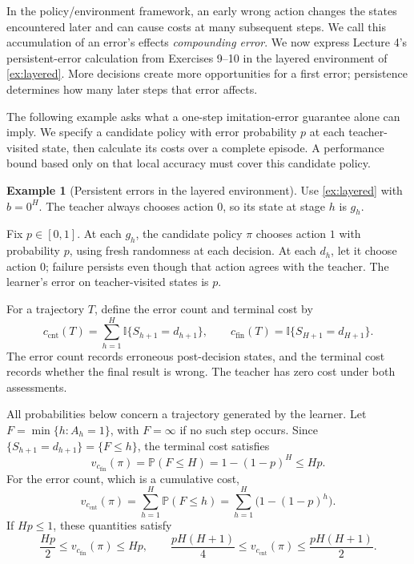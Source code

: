 \documentclass[11pt,twoside]{article}
\newcommand{\I}{\mathbb I}
\renewcommand{\P}{\mathbb P}
\theoremstyle{definition}
\newtheorem{example}[theorem]{Example}
\theoremstyle{remark}
\begin{document}
In the policy/environment framework, an early wrong action changes the
states encountered later and can cause costs at many subsequent steps.
We call this accumulation of an error's effects \emph{compounding error}.
We now express Lecture 4's persistent-error calculation from Exercises 9--10
in the layered environment of \cref{ex:layered}. More decisions create
more opportunities for a first error; persistence determines how many
later steps that error affects.

The following example asks what a one-step imitation-error guarantee alone
can imply. We specify a candidate policy with error probability $p$ at
each teacher-visited state, then calculate its costs over a complete episode.
A performance bound based only on that local accuracy must cover this
candidate policy.

\begin{example}[Persistent errors in the layered environment]
\label{ex:first-error}
Use \cref{ex:layered} with $b=0^H$. The teacher always chooses action $0$,
so its state at stage $h$ is $g_h$.

Fix $p\in[0,1]$. At each $g_h$, the candidate policy $\pi$ chooses action $1$
with probability $p$, using fresh randomness at each decision. At each $d_h$,
let it choose action $0$; failure persists even though that action agrees
with the teacher. The learner's error on teacher-visited states is $p$.

For a trajectory $T$, define the error count and terminal cost by
\[
 c_{\mathrm{cnt}}(T)=\sum_{h=1}^H\I\{S_{h+1}=d_{h+1}\},\qquad
 c_{\mathrm{fin}}(T)=\I\{S_{H+1}=d_{H+1}\}.
\]
The error count records erroneous post-decision states, and the terminal
cost records whether the final result is wrong. The teacher has zero cost
under both assessments.

All probabilities below concern a trajectory generated by the learner. Let
$F=\min\{h:A_h=1\}$, with $F=\infty$ if no such step occurs.
Since $\{S_{h+1}=d_{h+1}\}=\{F\le h\}$, the terminal cost satisfies
\begin{equation}
 v_{c_{\mathrm{fin}}}(\pi)=\P(F\le H)=1-(1-p)^H\le Hp.
 \label{eq:first-error}
\end{equation}
For the error count, which is a cumulative cost,
\begin{equation}
 v_{c_{\mathrm{cnt}}}(\pi)=\sum_{h=1}^H\P(F\le h)
          =\sum_{h=1}^H\bigl(1-(1-p)^h\bigr).
 \label{eq:cumulative-error}
\end{equation}
If $Hp\le1$, these quantities satisfy
\begin{equation}
 \frac{Hp}{2}\le v_{c_{\mathrm{fin}}}(\pi)\le Hp,\qquad
 \frac{pH(H+1)}4\le v_{c_{\mathrm{cnt}}}(\pi)\le\frac{pH(H+1)}2.
 \label{eq:compounding-bounds}
\end{equation}
\end{example}
\end{document}
